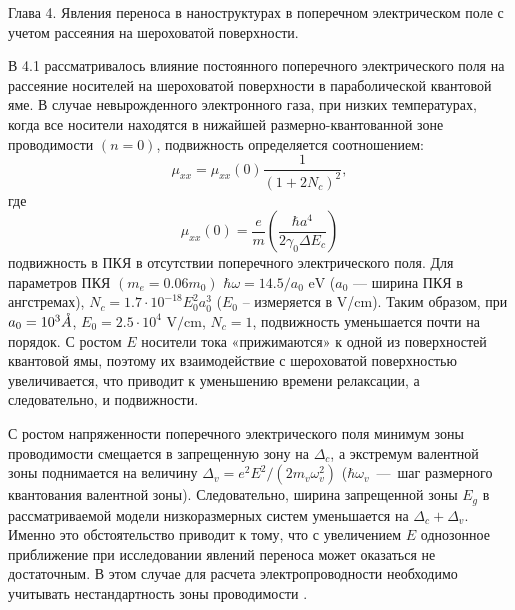 Глава 4. Явления переноса в наноструктурах в поперечном электрическом поле с учетом рассеяния на шероховатой поверхности.

В 4.1 рассматривалось влияние постоянного поперечного электрического поля на рассеяние носителей на шероховатой поверхности в параболической квантовой яме. В случае невырожденного электронного газа, при низких температурах, когда все носители находятся в нижайшей размерно-квантованной зоне проводимости $(n=0)$, подвижность определяется соотношением:
\begin{equation} \label{eq:syn_23}
\mu_{xx} =\mu_{xx}(0)\frac{1}{\left(1+2 N_c \right)^2 } ,
\end{equation}
где
\[
\mu_{xx}(0)=\frac{e}{m} \left(\frac{\hbar a^4 }{2\gamma_0 \Delta E_c } \right)
\]
подвижность в ПКЯ в отсутствии поперечного электрического поля.
Для параметров ПКЯ $(m_e = 0.06 m_0 )$ $\hbar \omega = 14.5/a_0 \text{ eV}$ ($a_0 $ --- ширина ПКЯ в ангстремах), $N_c =1.7\cdot 10^{-18} E_0^2 a_0^3 $ ($E_0 $ -- измеряется в V/cm). Таким образом, при $a_0 = 10^3 \AA$, $E_0 = 2.5\cdot 10^4 \text{ V/cm}$, $N_c =1$, подвижность уменьшается почти на порядок. С ростом $E$ носители тока «прижимаются» к одной из поверхностей квантовой ямы, поэтому их взаимодействие с шероховатой поверхностью увеличивается, что приводит к уменьшению времени релаксации, а следовательно, и подвижности.

С ростом напряженности поперечного электрического поля минимум зоны проводимости смещается в запрещенную зону на $\Delta_c $, а экстремум валентной зоны поднимается на величину $\Delta_v =e^2 E^2  / (2m_v  \omega_v^2 )$ ($\hbar \omega_v $~---~шаг размерного квантования валентной зоны). Следовательно, ширина запрещенной зоны $E_g$ в рассматриваемой модели низкоразмерных систем уменьшается на $\Delta_c +\Delta_v $. Именно это обстоятельство приводит к тому, что с увеличением $E$ однозонное приближение при исследовании явлений переноса может оказаться не достаточным. В этом случае для расчета электропроводности необходимо учитывать нестандартность зоны проводимости \cite{Lax1960,Cohen1961}.

